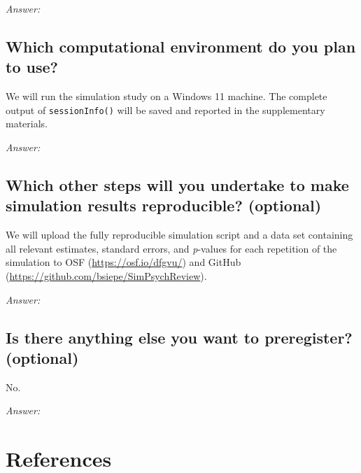 \documentclass[12pt]{article}
\begin{document}
\textit{Answer:}

\subsection{Which computational environment do you plan to use?} 
    
    
\begin{examplebox}
We will run the simulation study on a Windows 11 machine. The complete output of \texttt{sessionInfo()} will be saved and reported in the supplementary materials.
\end{examplebox}

\textit{Answer:}

\subsection{Which other steps will you undertake to make simulation results reproducible? \textmd{(optional)}} 
    
    
\begin{examplebox}
We will upload the fully reproducible simulation script and a data set containing all relevant estimates, standard errors, and \textit{p}-values for each repetition of the simulation to OSF (\url{https://osf.io/dfgvu/}) and GitHub (\url{https://github.com/bsiepe/SimPsychReview}). 
\end{examplebox}

\textit{Answer:}

\subsection{Is there anything else you want to preregister? \textmd{(optional)}}
    
    
\begin{examplebox}
No.
\end{examplebox} 

\textit{Answer:}

\newpage
\section*{References}
\nocite{Siepe2024}
\printbibliography[heading=none]
\end{document}
